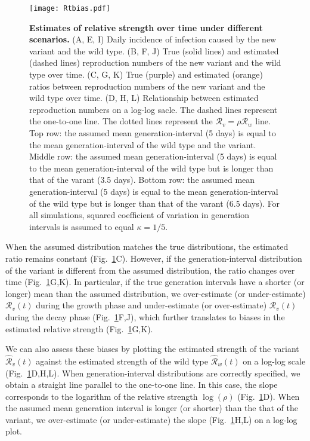 \documentclass[12pt]{article}
\newcommand{\fref}[1]{Fig.~\ref{fig:#1}}
\newcommand{\RR}{\ensuremath{{\mathcal R}}\xspace}
\begin{document}
\begin{figure}[!th]
\texttt{[image: Rtbias.pdf]}
\caption{
\textbf{Estimates of relative strength over time under different scenarios.}
(A, E, I) Daily incidence of infection caused by the new variant and the wild type.
(B, F, J) True (solid lines) and estimated (dashed lines) reproduction numbers of the new variant and the wild type over time.
(C, G, K) True (purple) and estimated (orange) ratios between reproduction numbers of the new variant and the wild type over time.
(D, H, L) Relationship between estimated reproduction numbers on a log-log sacle.
The dashed lines represent the one-to-one line. 
The dotted lines represent the $\RR_v=\rho \RR_w$ line. 
Top row: the assumed mean generation-interval (5 days) is equal to the mean generation-interval of the wild type and the variant.
Middle row: the assumed mean generation-interval (5 days) is equal to the mean generation-interval of the wild type but is longer than that of the varant (3.5 days).
Bottom row: the assumed mean generation-interval (5 days) is equal to the mean generation-interval of the wild type but is longer than that of the varant (6.5 days).
For all simulations, squared coefficient of variation in generation intervals is assumed to equal $\kappa = 1/5$.
}
\label{fig:Rtbias}
\end{figure}

When the assumed distribution matches the true distributions, the estimated ratio remains constant (\fref{Rtbias}C).
However, if the generation-interval distribution of the variant is different from the assumed distribution, the ratio changes over time (\fref{Rtbias}G,K).
In particular, if the true generation intervals have a shorter (or longer) mean than the assumed distribution, we over-estimate (or under-estimate) $\RR_v(t)$ during the growth phase and under-estimate (or over-estimate) $\RR_v(t)$ during the decay phase (\fref{Rtbias}F,J), which further translates to biases in the estimated relative strength (\fref{Rtbias}G,K).

We can also assess these biases by plotting the estimated strength of the variant $\hat{\RR}_v(t)$ against the estimated strength of the wild type $\hat{\RR}_w(t)$ on a log-log scale (\fref{Rtbias}D,H,L).
When generation-interval distributions are correctly specified, we obtain a straight line parallel to the one-to-one line. 
In this case, the slope corresponds to the logarithm of the relative strength $\log(\rho)$ (\fref{Rtbias}D).
When the assumed mean generation interval is longer (or shorter) than the that of the variant, we over-estimate (or under-estimate) the slope (\fref{Rtbias}H,L) on a log-log plot.
\end{document}
